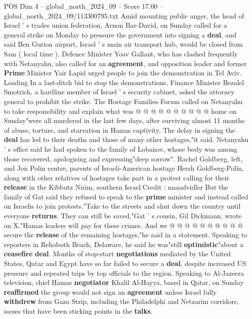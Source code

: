 \begin{textsample}{POS Dim 4 – global\_north\_2024\_09 – Score 17.00 – global\_north\_2024\_09/113300795.txt}
Amid mounting public anger, the head of Israel ' s trades union federation, Arnon Bar-David, on Sunday called for a general strike on Monday to pressure the government into signing a \textbf{deal}, and said Ben Gurion airport, Israel ' s main air transport hub, would be closed from 8am ( local time ).
Defence Minister Yoav Gallant, who has clashed frequently with Netanyahu, also called for an \textbf{agreement}, and opposition leader and former \textbf{Prime} Minister Yair Lapid urged people to join the demonstration in Tel Aviv.
Loading In a last-ditch bid to stop the demonstrations, Finance Minister Bezalel Smotrich, a hardline member of Israel ' s security cabinet, asked the attorney general to prohibit the strike.
The Hostage Families Forum called on Netanyahu to take responsibility and explain what was @ @ @ @ @ @ @ @ @ @ home on Sunday"were all murdered in the last few days, after surviving almost 11 months of abuse, torture, and starvation in Hamas captivity.
The delay in signing the \textbf{deal} has led to their deaths and those of many other hostages,"it said.
Netanyahu ' s office said he had spoken to the family of Lobanov, whose body was among those recovered, apologising and expressing"deep sorrow".
Rachel Goldberg, left, and Jon Polin centre, parents of Israeli-American hostage Hersh Goldberg-Polin, along with other relatives of hostages take part in a protest calling for their \textbf{release} in the Kibbutz Nirim, southern Israel.Credit : nnaadvidler But the family of Gat said they refused to speak to the \textbf{prime} minister and instead called on Israelis to join protests."Take to the streets and shut down the country until everyone \textbf{returns}.
They can still be saved,"Gat ' s cousin, Gil Dickmann, wrote on X."Hamas leaders will pay for these crimes.
And we @ @ @ @ @ @ @ @ @ @ secure the \textbf{release} of the remaining hostages,"he said in a statement.
Speaking to reporters in Rehoboth Beach, Delaware, he said he was"still \textbf{optimistic}"about a \textbf{ceasefire} \textbf{deal}.
Months of stop-start \textbf{negotiations} mediated by the United States, Qatar and Egypt have so far failed to secure a \textbf{deal}, despite increased US pressure and repeated trips by top officials to the region.
Speaking to Al-Jazeera television, chief Hamas \textbf{negotiator} Khalil Al-Hayya, based in Qatar, on Sunday \textbf{reaffirmed} the group would not sign an \textbf{agreement} unless Israel fully \textbf{withdrew} from Gaza Strip, including the Philadelphi and Netzarim corridors, issues that have been sticking points in the \textbf{talks}.

\end{textsample}
